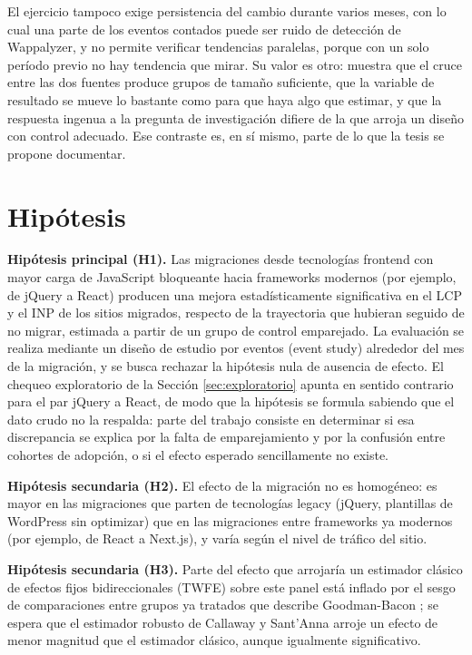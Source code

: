 \documentclass[12pt, a4paper]{article}
\begin{document}
El ejercicio tampoco exige persistencia del cambio durante varios meses, con lo cual una parte de los eventos contados puede ser ruido de detección de Wappalyzer, y no permite verificar tendencias paralelas, porque con un solo período previo no hay tendencia que mirar. Su valor es otro: muestra que el cruce entre las dos fuentes produce grupos de tamaño suficiente, que la variable de resultado se mueve lo bastante como para que haya algo que estimar, y que la respuesta ingenua a la pregunta de investigación difiere de la que arroja un diseño con control adecuado. Ese contraste es, en sí mismo, parte de lo que la tesis se propone documentar.

\section{Hipótesis}

\textbf{Hipótesis principal (H1).} Las migraciones desde tecnologías frontend con mayor carga de JavaScript bloqueante hacia frameworks modernos (por ejemplo, de jQuery a React) producen una mejora estadísticamente significativa en el LCP y el INP de los sitios migrados, respecto de la trayectoria que hubieran seguido de no migrar, estimada a partir de un grupo de control emparejado. La evaluación se realiza mediante un diseño de estudio por eventos (event study) alrededor del mes de la migración, y se busca rechazar la hipótesis nula de ausencia de efecto. El chequeo exploratorio de la Sección \ref{sec:exploratorio} apunta en sentido contrario para el par jQuery a React, de modo que la hipótesis se formula sabiendo que el dato crudo no la respalda: parte del trabajo consiste en determinar si esa discrepancia se explica por la falta de emparejamiento y por la confusión entre cohortes de adopción, o si el efecto esperado sencillamente no existe.

\textbf{Hipótesis secundaria (H2).} El efecto de la migración no es homogéneo: es mayor en las migraciones que parten de tecnologías legacy (jQuery, plantillas de WordPress sin optimizar) que en las migraciones entre frameworks ya modernos (por ejemplo, de React a Next.js), y varía según el nivel de tráfico del sitio.

\textbf{Hipótesis secundaria (H3).} Parte del efecto que arrojaría un estimador clásico de efectos fijos bidireccionales (TWFE) sobre este panel está inflado por el sesgo de comparaciones entre grupos ya tratados que describe Goodman-Bacon \cite{goodmanbacon2021}; se espera que el estimador robusto de Callaway y Sant'Anna \cite{callawaysantanna2021} arroje un efecto de menor magnitud que el estimador clásico, aunque igualmente significativo.
\end{document}

